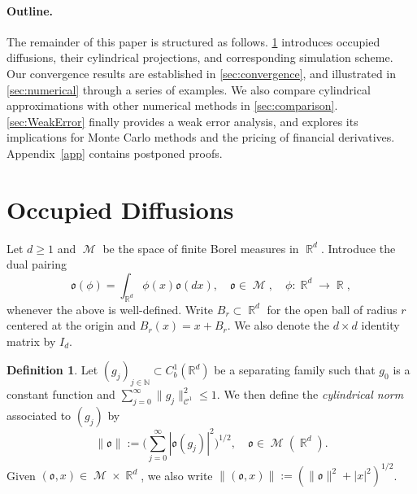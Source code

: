 \documentclass[11pt]{article}
\numberwithin{equation}{section}
\theoremstyle{plain}
\theoremstyle{definition}
\newtheorem{definition}{Definition}[section]
\DeclareMathOperator{\R}{\mathbb{R}}
\DeclareMathOperator{\calC}{\mathcal{C}}
\DeclareMathOperator{\calM}{\mathcal{M}}
\def\mo{\mathfrak{o}}
\begin{document}
\paragraph{Outline. }  The remainder of this paper is structured as follows. \cref{sec:occDiff} introduces occupied diffusions,  their cylindrical projections, and corresponding simulation scheme. Our  convergence results are established in \cref{sec:convergence}, and illustrated in \cref{sec:numerical} through a series  of examples. We also compare cylindrical approximations with other numerical methods in \cref{sec:comparison}. \cref{sec:WeakError} finally provides a weak error analysis, and explores its implications for Monte Carlo methods and the pricing of financial derivatives. Appendix~\ref{app}  contains postponed proofs. 
%



\section{Occupied Diffusions}\label{sec:occDiff}

Let $d\ge 1$ and $\calM$ be the space of finite Borel measures in $\R^d$. Introduce  the dual pairing 
$$\mo(\phi) = \int_{\R^d}\phi(x) \mo(dx), \quad \mo\in \calM, \quad \phi:\R^d \to \R,$$ 
whenever the above  is well-defined. 
Write $B_r\subset \R^d$ for the open ball of radius $r$ centered at the origin and $B_r(x) = x+ B_r$. %
We also denote the $d\times d$ identity matrix by $I_d$. 

\begin{definition}
   Let $(g_j)_{j \in \mathbb N} \subset C_b^1(\mathbb R^d)$ be a separating family  such that $g_0$ is a constant function and 
$\sum_{j=0}^{\infty} \lVert g_j \rVert^2_{\calC^1} \leq 1. $ We then  
define the \textit{cylindrical norm} associated to $(g_j)$ by 
\begin{equation}\label{eq:cylindricalNorm}
    \lVert \mo \rVert:= \Big( \sum_{j=0}^\infty |\mo(g_j)|^2\Big)^{1/2}, \quad \mo \in \calM(\R^d).
\end{equation} Given $(\mo,x) \in \calM \times \R^d$, we also write  $\lVert(\mo,x) \rVert := (\lVert \mo \rVert^2+ |x|^2)^{1/2}$. 
\end{definition}
\end{document}
